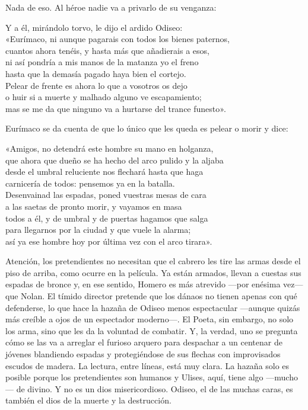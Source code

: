 Nada de eso. Al héroe nadie va a privarlo de su venganza:

\begin{versocita}
Y a él, mirándolo torvo, le dijo el ardido Odiseo:\\
«Eurímaco, ni aunque pagarais con todos los bienes paternos,\\
cuantos ahora tenéis, y hasta más que añadierais a esos,\\
ni así pondría a mis manos de la matanza yo el freno\\
hasta que la demasía pagado haya bien el cortejo.\\
Pelear de frente es ahora lo que a vosotros os dejo\\
o huir si a muerte y malhado alguno ve escapamiento;\\
mas se me da que ninguno va a hurtarse del trance funesto».
\end{versocita}

Eurímaco se da cuenta de que lo único que les queda es pelear o morir y dice:

\begin{versocita}
«Amigos, no detendrá este hombre su mano en holganza,\\
que ahora que dueño se ha hecho del arco pulido y la aljaba\\
desde el umbral reluciente nos flechará hasta que haga\\
carnicería de todos: pensemos ya en la batalla.\\
Desenvainad las espadas, poned vuestras mesas de cara\\
a las saetas de pronto morir, y vayamos en masa\\
todos a él, y de umbral y de puertas hagamos que salga\\
para llegarnos por la ciudad y que vuele la alarma;\\
así ya ese hombre hoy por última vez con el arco tirara».
\end{versocita}

Atención, los pretendientes no necesitan que el cabrero les tire las armas desde el piso de arriba, como ocurre en la película. Ya están armados, llevan a cuestas sus espadas de bronce y, en ese sentido, Homero es más atrevido ---por enésima vez--- que Nolan. El tímido director pretende que los dánaos no tienen apenas con qué defenderse, lo que hace la hazaña de Odiseo menos espectacular ---aunque quizás más creíble a ojos de un espectador moderno---. El Poeta, sin embargo, no solo los arma, sino que les da la voluntad de combatir. Y, la verdad, uno se pregunta cómo se las va a arreglar el furioso arquero para despachar a un centenar de jóvenes blandiendo espadas y protegiéndose de sus flechas con improvisados escudos de madera. La lectura, entre líneas, está muy clara. La hazaña solo es posible porque los pretendientes son humanos y Ulises, aquí, tiene algo ---mucho--- de divino. Y no es un dios misericordioso. Odiseo, el de las muchas caras, es también el dios de la muerte y la destrucción.

